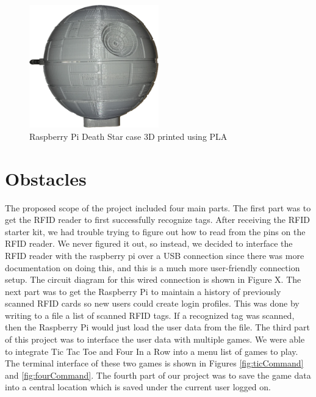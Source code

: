 \documentclass[notitlepage,11pt]{article}
\begin{document}
        \begin{figure}[h]
            \centering
            \includegraphics[width=0.5\textwidth]{images/deathstar.png}
            \caption{Raspberry Pi Death Star case 3D printed using PLA}
            \label{fig:death}
        \end{figure}

        
    \section{Obstacles}

        The proposed scope of the project included four main parts. The first 
        part was to get the RFID reader to first successfully recognize tags. 
        After receiving the RFID starter kit, we had trouble trying to figure out 
        how to read from the pins on the RFID reader. We never figured it out, so 
        instead, we decided to interface the RFID reader with the raspberry pi over 
        a USB connection since there was more documentation on doing this, and this is 
        a much more user-friendly connection setup. The circuit diagram for this wired 
        connection is shown in Figure X. The next part was to get the Raspberry Pi 
        to maintain a history of previously scanned RFID cards so new users could 
        create login profiles. This was done by writing to a file a list of scanned 
        RFID tags. If a recognized tag was scanned, then the Raspberry Pi would 
        just load the user data from the file. The third part of this project was 
        to interface the user data with multiple games. We were able to integrate 
        Tic Tac Toe and Four In a Row into a menu list of games to play. The 
        terminal interface of these two games is shown in Figures \ref{fig:ticCommand} 
        and \ref{fig:fourCommand}. The fourth part of our project was to save the 
        game data into a central location which is saved under the current user 
        logged on.
\end{document}
